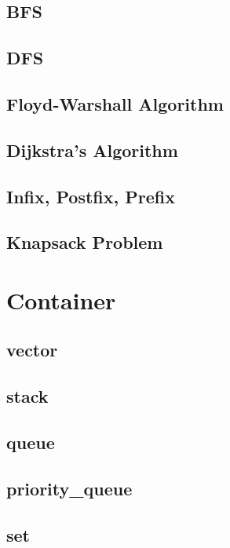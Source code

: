 \documentclass[a4paper, landscape, 8pt]{article}
\begin{document}
\begin{multicols*}{3}
\subsection{BFS}

\subsection{DFS}

\subsection{Floyd-Warshall Algorithm}

\subsection{Dijkstra's Algorithm}

\subsection{Infix, Postfix, Prefix}

\subsection{Knapsack Problem}


\section{Container}
\subsection{vector}

\subsection{stack}

\subsection{queue}

\subsection{priority\_queue}

\subsection{set}


\end{multicols*}
\end{document}
